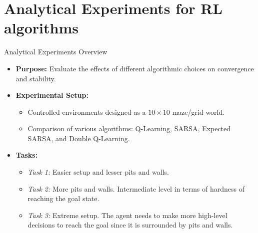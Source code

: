 \documentclass{beamer}
\begin{document}
\section{Analytical Experiments for RL algorithms}
\begin{frame}{Analytical Experiments Overview}
  \begin{itemize}[<+->]
    \item \textbf{Purpose:} Evaluate the effects of different algorithmic choices on convergence and stability.
    \item \textbf{Experimental Setup:}
      \begin{itemize}[<+->]
        \item Controlled environments designed as a $10 \times 10$ maze/grid world.
        \item Comparison of various algorithms: Q-Learning, SARSA, Expected SARSA, and Double Q-Learning.
      \end{itemize}
    \item \textbf{Tasks:}
      \begin{itemize}
        \item<+-> \emph{Task 1:} Easier setup and lesser pits and walls.
        \item<+-> \emph{Task 2:} More pits and walls. Intermediate level in terms of hardness of reaching the goal state.
        \item<+-> \emph{Task 3:} Extreme setup. The agent needs to make more high-level decisions to reach the goal since it is surrounded by pits and walls.
      \end{itemize}
  \end{itemize}
\end{frame}
\end{document}
